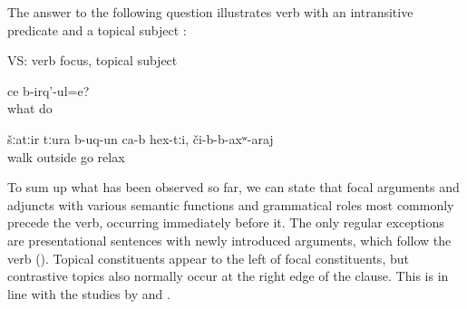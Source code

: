 The answer to the following question illustrates verb  with an intransitive predicate and a topical subject :
%
\begin{exe}
	\ex	VS: verb focus, topical subject	\label{ex:What are (they) doing They went for a walk, to relax}
	\begin{xlist}
		\ex	\label{ex:What are (they) doing Q}
		\gll	ce	b-irq'-ul=e?\\
			what	do\\
		\glt	{}

		\ex	\label{ex:They went for a walk, to relax A}
		\gll	šːatːir	tːura	b-uq-un ca-b	hex-tːi,		či-b-b-axʷ-araj\\
			walk	outside	go			relax\\
		\glt	{}
	\end{xlist}
\end{exe}

To sum up what has been observed so far, we can state that focal arguments and adjuncts with various semantic functions and grammatical roles most commonly precede the verb, occurring immediately before it.  The only regular exceptions are presentational sentences with newly introduced arguments, which follow the verb (). Topical constituents appear to the left of focal constituents, but contrastive topics also normally occur at the right edge of the clause. This is in line with the studies by \citet{Testelec1998a, Testelec1998b} and \citet{Forker.Belyaev2016}.


